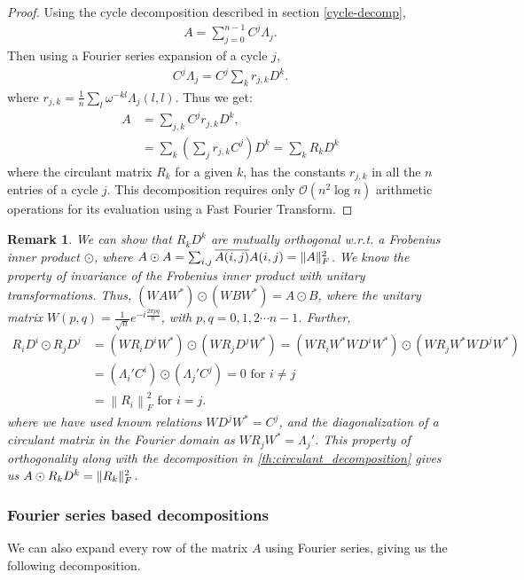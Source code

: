 \documentclass[onefignum,onetabnum]{siamart171218}
\newtheorem{Remark}[theorem]{Remark}
\newcommand{\normF}[1]{\left\|#1\right\|_F}
\DeclarePairedDelimiter\norm{\lVert}{\rVert}
\begin{document}
\begin{proof}
    Using the cycle decomposition described in section \ref{cycle-decomp},
    \begin{align}
        A = \sum \limits_{j=0}^{n-1} C^j \Lambda_j. \label{rightdecomp}
    \end{align}
    Then using a Fourier series expansion of a cycle $j$,
   \begin{align}
        C^j \Lambda_j = C^j\sum_{k}  r_{j,k} D^k.
   \end{align}
where $r_{j,k}=\frac{1}{n} \sum_l \omega^{-kl}\Lambda_j(l,l)$. Thus we get: 
   \begin{align*}
    A &= \sum_{j,k} C^j r_{j,k} D^k, \\
    & = \sum_{k} \left(\sum_{j} r_{j,k} C^j \right) D^k = \sum_{k} R_k D^k
   \end{align*}
where the circulant matrix $R_k$ for a given $k$, has the constants $r_{j,k}$ in all the $n$ entries of a cycle $j$. This decomposition requires only $\mathcal{O}(n^2 \log n)$ arithmetic operations for its evaluation using a Fast Fourier Transform. 
\end{proof}


\begin{Remark}
We can show that $R_kD^k$ are mutually orthogonal w.r.t. a Frobenius inner product $\odot$, where $A \odot A = \sum_{i,j} \overline{A(i,j)}A(i,j) = \norm{A}_F^2$. We know the property of invariance of the Frobenius inner product with unitary transformations\cite{Hari2024circulant}. Thus, $(WAW^*)\odot(WBW^*) = A \odot B$, where the unitary matrix $W(p,q) = \frac{1}{\sqrt{n}}e^{-i \frac{2\pi pq}{n}}$, with $p,q=0,1,2\cdots n-1$. Further, 
\begin{align*}
    R_iD^i \odot R_jD^j &= (WR_iD^iW^*) \odot (WR_jD^jW^*) = (WR_iW^*WD^iW^*) \odot (WR_jW^*WD^jW^*)\\
    &=(\Lambda_i'C^i) \odot (\Lambda_j'C^j) = 0 \text{ for } i \neq j\\
    &= \normF{R_i}^2 \text{ for } i=j.
\end{align*}
where we have used known relations $WD^jW^*=C^j$, and the diagonalization of a circulant matrix in the Fourier domain as $WR_jW^*=\Lambda_j'$. This property of orthogonality along with the decomposition in \cref{th:circulant_decomposition} gives us $A \odot R_kD^k = \norm{R_k}_F^2$. 
\end{Remark}

\subsubsection{Fourier series based decompositions}
We can also expand every row of the matrix $A$ using Fourier series, giving us the following decomposition.
\end{document}
